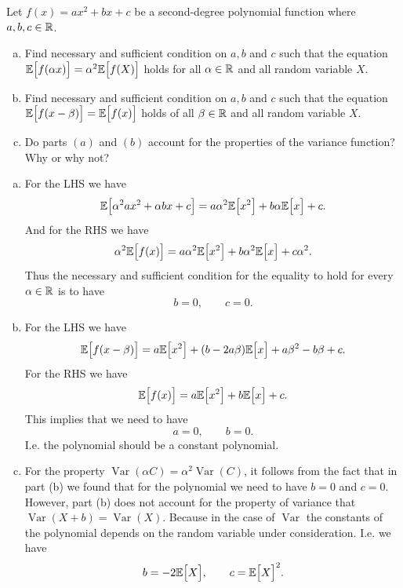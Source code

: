 \begin{problem}
	Let $ f(x) = ax^2 + bx + c $ be a second-degree polynomial function where $ a,b,c \in \mathbb{R} $.
	\begin{enumerate}[(a)]
		\item Find necessary and sufficient condition on $ a,b $ and $ c $ such that the equation $ \mathbb{E}\big[f(\alpha x)\big] = \alpha^2 \mathbb{E}\big[f(X)\big] $ holds for all $ \alpha \in \mathbb{R} $ and all random variable $ X $. 
		\item Find necessary and sufficient condition on $ a,b $ and $ c $ such that the equation $ \mathbb{E}\big[f(x-\beta)\big] = \mathbb{E}\big[f(x)\big] $ holds of all $ \beta \in \mathbb{R} $ and all random variable $ X $.
		\item Do parts $ (a) $ and $ (b) $ account for the properties of the variance function? Why or why not?
	\end{enumerate}
\end{problem}
\begin{solution}
	\begin{enumerate}[(a)]
		\item For the LHS we have
		\[ \mathbb{E}\big[\alpha^2 a x^2 + \alpha b x + c\big] = a\alpha^2 \mathbb{E}\big[x^2\big] + b\alpha \mathbb{E}\big[x\big] + c. \]
		And for the RHS we have
		\[ \alpha^2\mathbb{E}\big[f(x)\big] = a\alpha^2\mathbb{E}\big[x^2\big] + b\alpha^2 \mathbb{E}\big[x\big] + c\alpha^2. \] 
		Thus the necessary and sufficient condition for the equality to hold for every $ \alpha \in \mathbb{R} $ is to have
		\[ b = 0, \qquad c = 0. \]
		\item For the LHS we have
		\[ \mathbb{E}\big[f(x-\beta)\big] = a\mathbb{E}\big[x^2\big] + (b - 2a\beta)\mathbb{E}\big[x\big] + a\beta^2 - b\beta + c.  \]
		For the RHS we have
		\[ \mathbb{E}\big[f(x)\big] = a\mathbb{E}\big[x^2\big] + b\mathbb{E}\big[x\big] + c. \]
		This implies that we need to have 
		\[ a = 0, \qquad b = 0. \]
		I.e. the polynomial should be a constant polynomial.
		\item For the property $ \operatorname{Var}{(\alpha C)} = \alpha^2 \operatorname{Var}{(C)} $, it follows from the fact that in part (b) we found that for the polynomial we need to have $ b = 0 $ and $ c = 0 $. However, part (b) does not account for the property of variance that $ \operatorname{Var}(X+b) = \operatorname{Var}(X) $. Because in the case of $ \operatorname{Var} $ the constants of the polynomial depends on the random variable under consideration. I.e. we have
		\[ b = - 2 \mathbb{E}\big[X\big], \qquad c = \mathbb{E}\big[X\big]^2. \]
	\end{enumerate}
\end{solution}

